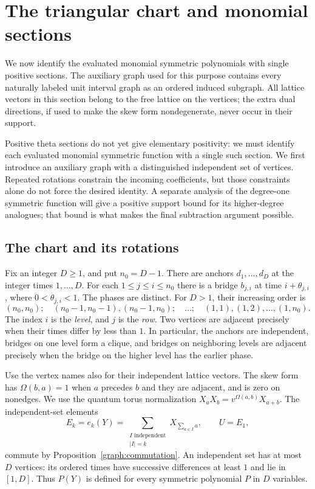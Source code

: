 \section{The triangular chart and monomial sections}\label{tri:section}

We now identify the evaluated monomial symmetric polynomials with single
positive sections.  The auxiliary graph used for this purpose contains every
naturally labeled unit interval graph as an ordered induced subgraph.
All lattice vectors in this section belong to the free lattice on the
vertices; the extra dual directions, if used to make the skew form
nondegenerate, never occur in their support.

Positive theta sections do not yet give elementary positivity: we must
identify each evaluated monomial symmetric function with a single such
section.  We first introduce an auxiliary graph with a distinguished
independent set of vertices.  Repeated rotations constrain the incoming
coefficients, but those constraints alone do not force the desired
identity.  A separate analysis of the degree-one symmetric function
will give a positive support bound for its higher-degree analogues;
that bound is what makes the final subtraction argument possible.

\subsection{The chart and its rotations}

Fix an integer $D\geq 1$, and put $n_0=D-1$.  There are anchors
$d_1,\ldots,d_D$ at the integer times $1,\ldots,D$.  For each
$1\leq j\leq i\leq n_0$ there is a bridge $b_{j,i}$ at time
$i+\theta_{j,i}$, where $0<\theta_{j,i}<1$.  The phases are distinct.
For $D>1$, their increasing order is
\begin{equation}\label{tri:phase-order}
 (n_0,n_0);\quad (n_0-1,n_0-1),(n_0-1,n_0);\quad\ldots;\quad
 (1,1),(1,2),\ldots,(1,n_0).
\end{equation}
The index $i$ is the \emph{level}, and $j$ is the \emph{row}.
Two vertices are adjacent precisely when their times differ by less than
$1$.  In particular, the anchors are independent, bridges on one level
form a clique, and bridges on neighboring levels are adjacent precisely
when the bridge on the higher level has the earlier phase.

Use the vertex names also for their independent lattice vectors.  The
skew form has $\Omega(b,a)=1$ when $a$ precedes $b$ and they are adjacent,
and is zero on nonedges.  We use the quantum torus normalization
$X_aX_b=v^{\Omega(a,b)}X_{a+b}$.
The independent-set elements
\[
 E_k=e_k(Y)=\sum_{\substack{I\text{ independent}\\ |I|=k}}
 X_{\sum_{a\in I}a},\qquad U=E_1,
\]
commute by Proposition~\ref{graph:commutation}.  An independent set has at
most $D$ vertices: its ordered times have successive differences at least
$1$ and lie in $[1,D]$.  Thus $P(Y)$ is defined for every symmetric
polynomial $P$ in $D$ variables.

